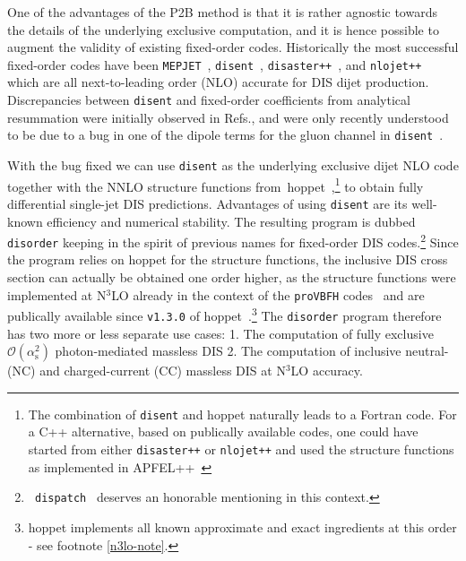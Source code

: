 \documentclass[submission, PhysCodeb]{SciPost_better_arXiv}
\newcommand{\hoppet}{{\sc hoppet}}
\newcommand{\disent}{{\tt disent}}
\newcommand{\disorder}{{\tt disorder}}
\newcommand{\provbfh}{{\tt proVBFH}}
\newcommand{\disaster}{{\tt disaster++}}
\newcommand{\nlojet}{{\tt nlojet++}}
\newcommand{\as}{\alpha_{\mathrm{s}}}
\newcommand{\NNNLO}{N$^3$LO}
\begin{document}
One of the advantages of the P2B method is that it is rather agnostic
towards the details of the underlying exclusive computation, and it is
hence possible to augment the validity of existing fixed-order
codes. Historically the most successful fixed-order codes have been
{\tt MEPJET}~\cite{Mirkes:1995ks}, \disent{}~\cite{Catani:1996vz},
\disaster{}~\cite{Graudenz:1997gv}, and \nlojet{}~\cite{Nagy:2001xb}
which are all next-to-leading order (NLO) accurate for DIS dijet
production. Discrepancies between \disent{} and fixed-order
coefficients from analytical resummation were initially observed in
Refs.\cite{Antonelli:1999kx,Dasgupta:2002dc}, and were only recently
understood to be due to a bug in one of the dipole terms for the gluon
channel in \disent{}~\cite{Borsa:2020ulb,Borsa:2020yxh}.

With the bug fixed we can use \disent{} as the underlying exclusive
dijet NLO code together with the NNLO structure functions
from~\hoppet{}~\cite{Salam:2008qg,BertoneKarlberg},\footnote{The
combination of \disent{} and \hoppet{} naturally leads to a Fortran
code. For a C++ alternative, based on publically available codes, one
could have started from either \disaster{} or \nlojet{} and used the
structure functions as implemented in
APFEL++~\cite{Bertone:2013vaa,Bertone:2017gds}} to obtain fully
differential single-jet DIS predictions. Advantages of using \disent{}
are its well-known efficiency and numerical stability. The resulting
program is dubbed \disorder{} keeping in the spirit of previous names
for fixed-order DIS codes.\footnote{{\tt
  dispatch}~\cite{Dasgupta:2002dc} deserves an honorable mentioning in
this context.} Since the program relies on \hoppet{} for the structure
functions, the inclusive DIS cross section can actually be obtained
one order higher, as the structure functions were implemented at
\NNNLO{} already in the context of the \provbfh{}
codes~\cite{Cacciari:2015jma,Dreyer:2016oyx,Dreyer:2018qbw,Dreyer:2018rfu}
and are publically available since {\tt v1.3.0} of
\hoppet{}~\cite{hoppetv130}.\footnote{\hoppet{} implements all known
approximate and exact ingredients at this order - see footnote
\ref{n3lo-note}.} The \disorder{} program therefore has two more or
less separate use cases: 1. The computation of fully exclusive
$\mathcal{O}(\as^2)$ photon-mediated massless DIS 2. The computation
of inclusive neutral- (NC) and charged-current (CC) massless DIS at
\NNNLO{} accuracy.
\end{document}
